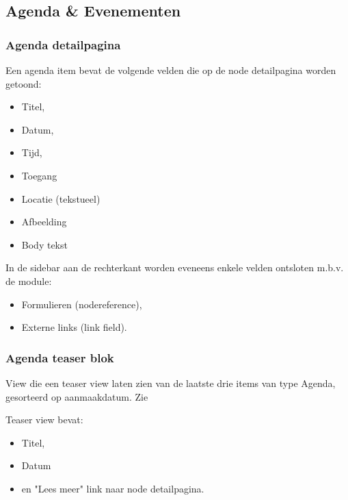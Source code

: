 \subsection{Agenda \& Evenementen}\label{agenda-en-evenementen}

\subsubsection{Agenda detailpagina}\label{agenda-detail}

Een agenda item bevat de volgende velden die op de node detailpagina worden getoond:
\begin{itemize}
\item Titel,
\item Datum,
\item Tijd,
\item Toegang
\item Locatie (tekstueel)
\item Afbeelding
\item Body tekst
\end{itemize}

In de sidebar aan de rechterkant worden eveneens enkele velden ontsloten m.b.v. de  module:
\begin{itemize}
\item Formulieren (nodereference),
\item Externe links (link field).
\end{itemize}

\subsubsection{Agenda teaser blok}

View die een teaser view laten zien van de laatste drie items van type Agenda, gesorteerd op aanmaakdatum. Zie 

Teaser view bevat:
\begin{itemize}
\item Titel,
\item Datum
\item en "Lees meer" link naar node detailpagina.
\end{itemize}